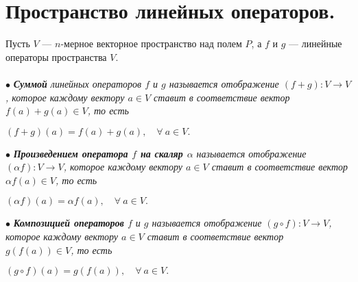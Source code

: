 \section{Пространство линейных операторов.}
Пусть $V$ --- $n$-мерное векторное пространство над полем $P$, а $f$ и $g$ --- линейные операторы пространства $V$.\\\\
$\bullet$\textit{\textbf{ Суммой} линейных операторов $f$ и $g$ называется отображение $(f + g) : V\rightarrow V$, которое каждому вектору $a\in V$ ставит в соответствие вектор $f(a) + g(a)\in V$, то есть }
\begin{center}
	$(f+g)(a) = f(a) + g(a),\quad \forall\ a \in V.$
\end{center}
$\bullet$ \textit{\textbf{Произведением оператора $f$ на скаляр $\alpha$} называется отображение $(\alpha f) : V\rightarrow V$, которое каждому вектору $a\in V$ ставит в соответствие вектор $\alpha f(a)\in V$, то есть}
\begin{center}
	$(\alpha f)(a) = \alpha f(a),\quad \forall\ a \in V.$
\end{center}
$\bullet$ \textit{\textbf{Композицией операторов} $f$ и $g$ называется отображение $(g \circ f) : V\rightarrow V$, которое каждому вектору $a\in V$ ставит в соответствие вектор $g(f(a))\in V$, то есть}
\begin{center}
	$(g \circ f)(a) =g(f(a)),\quad \forall\ a \in V.$
\end{center}
